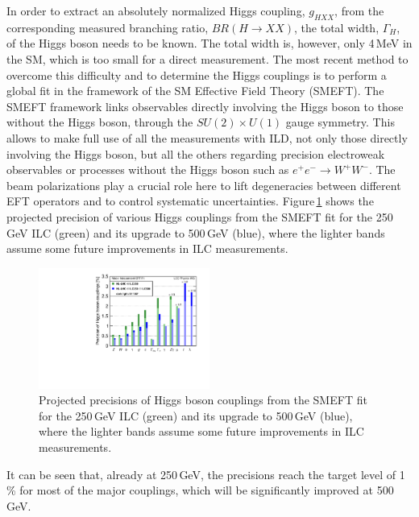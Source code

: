 In order to extract an absolutely normalized Higgs coupling, $g_{HXX}$, from the corresponding measured branching ratio, $BR(H \to XX)$, the total width, $\Gamma_H$, of the Higgs boson needs to be known. The total width is, however, only 4\,MeV in the SM, which is too small for a direct measurement. The most recent method to overcome this difficulty and to determine the Higgs couplings is to perform a global fit in the framework of the SM Effective Field Theory (SMEFT)\cite{Barklow:2017suo,Barklow:2017awn}. The SMEFT framework links observables directly involving the Higgs boson to those without the Higgs boson, through the $SU(2) \times U(1)$ gauge symmetry. This allows to make full use of all the measurements with ILD, not only those directly involving the Higgs boson, but all the others regarding precision electroweak observables or processes without the Higgs boson such as $e^+e^- \to W^+W^-$\cite{Karl:2019hes}. The beam polarizations play a crucial role here to lift degeneracies between different EFT operators and to control systematic uncertainties. Figure\,\ref{fig:Manhattan} shows the projected precision of various Higgs couplings from the SMEFT fit for the 250\,GeV ILC (green) and its upgrade to 500\,GeV (blue), where the lighter bands assume some future improvements in ILC measurements\cite{Ref:ILCESU1}.
\begin{figure}[htbp]
\begin{center}
 \includegraphics[width=0.5\textwidth]{Science/fig/DeltaHXX_SM_ILC_MI_S12s.pdf}
\end{center}
\caption{Projected precisions of Higgs boson couplings from the SMEFT fit for the 250\,GeV ILC (green) and its upgrade to 500\,GeV (blue), where the lighter bands assume some future improvements in ILC measurements\cite{Ref:ILCESU1}.
}
\label{fig:Manhattan}
\end{figure}
It can be seen that, already at 250\,GeV, the precisions reach the target level of 1\,\% for most of the major couplings, which will be significantly improved at 500\,GeV.

